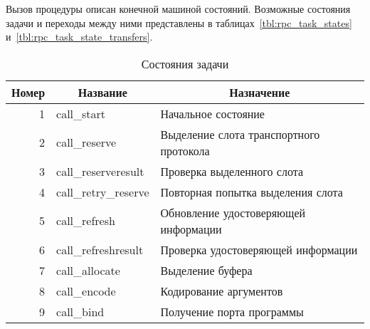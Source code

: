 Вызов процедуры описан конечной машиной состояний. Возможные состояния задачи и
переходы между ними представлены в таблицах~\ref{tbl:rpc_task_states}
и~\ref{tbl:rpc_task_state_transfers}.

\clearpage

\begin{table}[htb!]
    \centering
    \begin{threeparttable}
        \caption{Состояния задачи}
        \begin{tabular}{|r|l|l|}
        \hline
        \multicolumn{1}{|c|}{Номер} & \multicolumn{1}{c|}{Название} & \multicolumn{1}{c|}{Назначение}                                                               \\ \hline
        1                           & call\_start                   & Начальное состояние                                                                           \\ \hline
        2                           & call\_reserve                 & Выделение слота транспортного протокола                                                       \\ \hline
        3                           & call\_reserveresult           & Проверка выделенного слота                                                                    \\ \hline
        4                           & call\_retry\_reserve          & Повторная попытка выделения слота                                                             \\ \hline
        5                           & call\_refresh                 & Обновление удостоверяющей информации                                                          \\ \hline
        6                           & call\_refreshresult           & Проверка удостоверяющей информации                                                            \\ \hline
        7                           & call\_allocate                & Выделение буфера                                                                              \\ \hline
        8                           & call\_encode                  & Кодирование аргументов                                                                        \\ \hline
        9                           & call\_bind                    & Получение порта программы                                                                     \\ \hline

\end{tabular}
\end{threeparttable}
\end{table}
